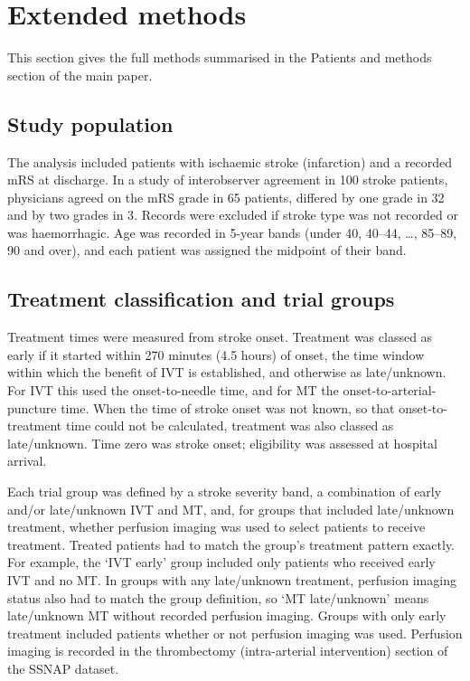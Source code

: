 \section{Extended methods}\label{sec:supp_methods}

This section gives the full methods summarised in the Patients and methods section of the main paper.

\subsection*{Study population}

The analysis included patients with ischaemic stroke (infarction) and a recorded mRS at discharge. In a study of interobserver agreement in 100 stroke patients, physicians agreed on the mRS grade in 65 patients, differed by one grade in 32 and by two grades in 3\cite{van_swieten_interobserver_1988}. Records were excluded if stroke type was not recorded or was haemorrhagic. Age was recorded in 5-year bands (under 40, 40--44, \ldots, 85--89, 90 and over), and each patient was assigned the midpoint of their band.

\subsection*{Treatment classification and trial groups}

Treatment times were measured from stroke onset. Treatment was classed as early if it started within 270 minutes (4.5 hours) of onset, the time window within which the benefit of IVT is established\cite{emberson_effect_2014}, and otherwise as late/unknown. For IVT this used the onset-to-needle time, and for MT the onset-to-arterial-puncture time. When the time of stroke onset was not known, so that onset-to-treatment time could not be calculated, treatment was also classed as late/unknown. Time zero was stroke onset; eligibility was assessed at hospital arrival.

Each trial group was defined by a stroke severity band, a combination of early and/or late/unknown IVT and MT, and, for groups that included late/unknown treatment, whether perfusion imaging was used to select patients to receive treatment. Treated patients had to match the group's treatment pattern exactly. For example, the `IVT early' group included only patients who received early IVT and no MT. In groups with any late/unknown treatment, perfusion imaging status also had to match the group definition, so `MT late/unknown' means late/unknown MT without recorded perfusion imaging. Groups with only early treatment included patients whether or not perfusion imaging was used. Perfusion imaging is recorded in the thrombectomy (intra-arterial intervention) section of the SSNAP dataset.


